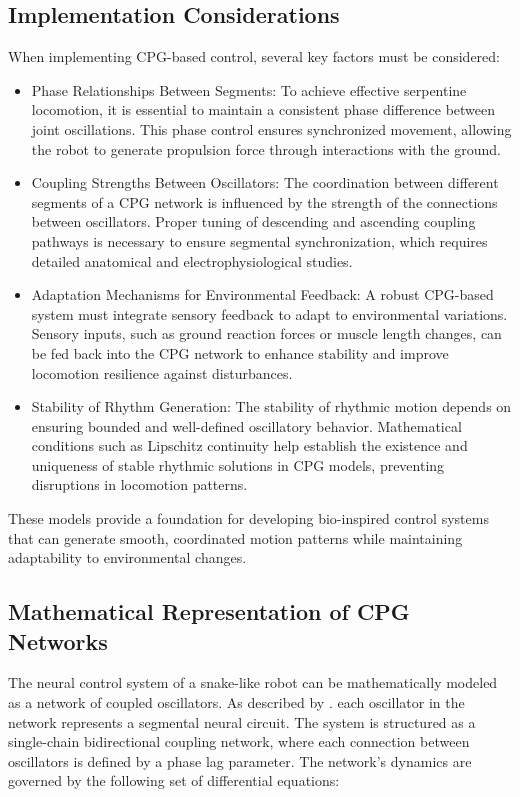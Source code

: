\documentclass[12pt,a4paper]{report}
\begin{document}
\subsection{Implementation Considerations}
When implementing CPG-based control, several key factors must be considered:
\begin{itemize}
    \item Phase Relationships Between Segments: To achieve effective serpentine locomotion, it is essential to maintain a consistent phase difference between joint oscillations. This phase control ensures synchronized movement, allowing the robot to generate propulsion force through interactions with the ground\textcite{Norzalilah2014}.
    \item Coupling Strengths Between Oscillators: The coordination between different segments of a CPG network is influenced by the strength of the connections between oscillators. Proper tuning of descending and ascending coupling pathways is necessary to ensure segmental synchronization, which requires detailed anatomical and electrophysiological studies\textcite{MARDER2001R986}.
    \item Adaptation Mechanisms for Environmental Feedback: A robust CPG-based system must integrate sensory feedback to adapt to environmental variations. Sensory inputs, such as ground reaction forces or muscle length changes, can be fed back into the CPG network to enhance stability and improve locomotion resilience against disturbances\textcite{Inoue2007}.
    \item Stability of Rhythm Generation: The stability of rhythmic motion depends on ensuring bounded and well-defined oscillatory behavior. Mathematical conditions such as Lipschitz continuity help establish the existence and uniqueness of stable rhythmic solutions in CPG models, preventing disruptions in locomotion patterns\textcite{Zhenli2006}.
\end{itemize}

These models provide a foundation for developing bio-inspired control systems that can generate smooth, coordinated motion patterns while maintaining adaptability to environmental changes.

\subsection{Mathematical Representation of CPG Networks}

The neural control system of a snake-like robot can be mathematically modeled as a network of coupled oscillators. As described by \textcite{wang2020cpg}. each oscillator in the network represents a segmental neural circuit. The system is structured as a single-chain bidirectional coupling network, where each connection between oscillators is defined by a phase lag parameter. The network's dynamics are governed by the following set of differential equations:
\end{document}
